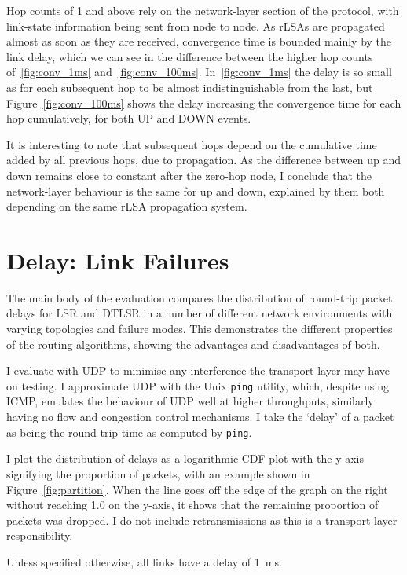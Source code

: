 \documentclass[withindex,glossary,openany]{cam-thesis}
\begin{document}
Hop counts of 1 and above rely on the network-layer section of the protocol, with link-state information being sent from node to node. As rLSAs are propagated almost as soon as they are received, convergence time is bounded mainly by the link delay, which we can see in the difference between the higher hop counts of~\ref{fig:conv_1ms} and~\ref{fig:conv_100ms}. In~\ref{fig:conv_1ms} the delay is so small as for each subsequent hop to be almost indistinguishable from the last, but Figure~\ref{fig:conv_100ms} shows the delay increasing the convergence time for each hop cumulatively, for both UP and DOWN events.

It is interesting to note that subsequent hops depend on the cumulative time added by all previous hops, due to propagation. As the difference between up and down remains close to constant after the zero-hop node, I conclude that the network-layer behaviour is the same for up and down, explained by them both depending on the same rLSA propagation system.


\section{Delay: Link Failures}

The main body of the evaluation compares the distribution of round-trip packet delays for LSR and DTLSR in a number of different network environments with varying topologies and failure modes. This demonstrates the different properties of the routing algorithms, showing the advantages and disadvantages of both.

I evaluate with UDP to minimise any interference the transport layer may have on testing. I approximate UDP with the Unix \texttt{ping} utility, which, despite using ICMP, emulates the behaviour of UDP well at higher throughputs, similarly having no flow and congestion control mechanisms. I take the `delay' of a packet as being the round-trip time as computed by \texttt{ping}.

I plot the distribution of delays as a logarithmic CDF plot with the y-axis signifying the proportion of packets, with an example shown in Figure~\ref{fig:partition}. When the line goes off the edge of the graph on the right without reaching 1.0 on the y-axis, it shows that the remaining proportion of packets was dropped. I do not include retransmissions as this is a transport-layer responsibility.

Unless specified otherwise, all links have a delay of \SI{1}{\ms}.
\end{document}
